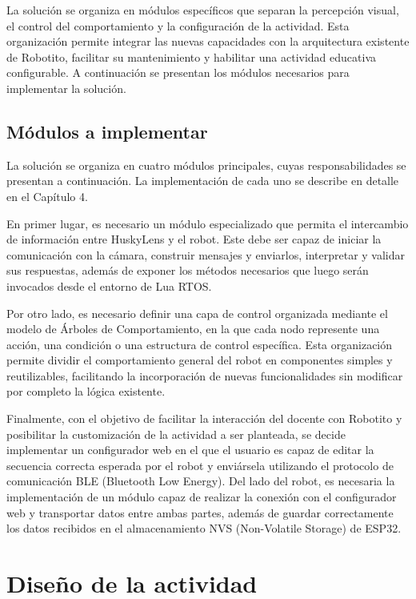 \documentclass{prgrado}
\begin{document}
La solución se organiza en módulos específicos que separan la percepción visual, el control del comportamiento y la configuración de la actividad. Esta organización permite integrar las nuevas capacidades con la arquitectura existente de Robotito, facilitar su mantenimiento y habilitar una actividad educativa configurable. A continuación se presentan los módulos necesarios para implementar la solución.

\subsection{Módulos a implementar}

La solución se organiza en cuatro módulos principales, cuyas responsabilidades se presentan a continuación. La implementación de cada uno se describe en detalle en el Capítulo 4.

En primer lugar, es necesario un módulo especializado que permita el intercambio de información entre HuskyLens y el robot. Este debe ser capaz de iniciar la comunicación con la cámara, construir mensajes y enviarlos, interpretar y validar sus respuestas, además de exponer los métodos necesarios que luego serán invocados desde el entorno de Lua RTOS.

Por otro lado, es necesario definir una capa de control organizada mediante el modelo de Árboles de Comportamiento, en la que cada nodo represente una acción, una condición o una estructura de control específica. Esta organización permite dividir el comportamiento general del robot en componentes simples y reutilizables, facilitando la incorporación de nuevas funcionalidades sin modificar por completo la lógica existente.

Finalmente, con el objetivo de facilitar la interacción del docente con Robotito y posibilitar la customización de la actividad a ser planteada, se decide implementar un configurador web en el que el usuario es capaz de editar la secuencia correcta esperada por el robot y enviársela utilizando el protocolo de comunicación BLE (Bluetooth Low Energy). Del lado del robot, es necesaria la implementación de un módulo capaz de realizar la conexión con el configurador web y transportar datos entre ambas partes, además de guardar correctamente los datos recibidos en el almacenamiento NVS (Non-Volatile Storage) de ESP32.

\section{Diseño de la actividad}
\end{document}
